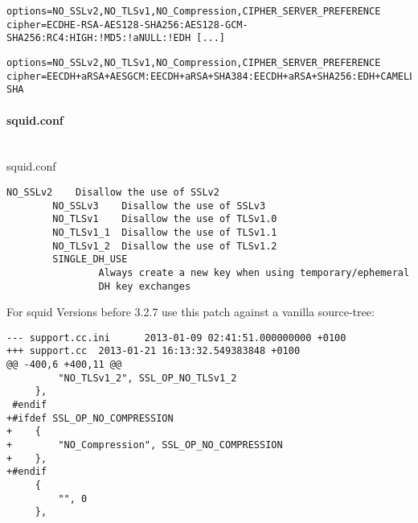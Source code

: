 \begin{lstlisting}[breaklines]
options=NO_SSLv2,NO_TLSv1,NO_Compression,CIPHER_SERVER_PREFERENCE 
cipher=ECDHE-RSA-AES128-SHA256:AES128-GCM-SHA256:RC4:HIGH:!MD5:!aNULL:!EDH [...]
\end{lstlisting}



\begin{lstlisting}[breaklines]
options=NO_SSLv2,NO_TLSv1,NO_Compression,CIPHER_SERVER_PREFERENCE 
cipher=EECDH+aRSA+AESGCM:EECDH+aRSA+SHA384:EECDH+aRSA+SHA256:EDH+CAMELLIA256:EECDH:EDH+aRSA:+SSLv3:!aNULL:!eNULL:!LOW:!3DES:!MD5:!EXP:!PSK:!SRP:!DSS:!RC4:!SEED:!AES128:!CAMELLIA128:!ECDSA:AES256-SHA
\end{lstlisting}



\paragraph*{squid.conf}\mbox{}\\
squid.conf


\begin{lstlisting}[breaklines]
		NO_SSLv2    Disallow the use of SSLv2
		NO_SSLv3    Disallow the use of SSLv3
		NO_TLSv1    Disallow the use of TLSv1.0
		NO_TLSv1_1  Disallow the use of TLSv1.1
		NO_TLSv1_2  Disallow the use of TLSv1.2
		SINGLE_DH_USE
				Always create a new key when using temporary/ephemeral
				DH key exchanges
\end{lstlisting}

For squid Versions before 3.2.7 use this patch against a vanilla source-tree:

\begin{lstlisting}[breaklines]
--- support.cc.ini      2013-01-09 02:41:51.000000000 +0100
+++ support.cc  2013-01-21 16:13:32.549383848 +0100
@@ -400,6 +400,11 @@
         "NO_TLSv1_2", SSL_OP_NO_TLSv1_2
     },
 #endif
+#ifdef SSL_OP_NO_COMPRESSION
+    {
+        "NO_Compression", SSL_OP_NO_COMPRESSION
+    },
+#endif
     {
         "", 0
     },
\end{lstlisting}



